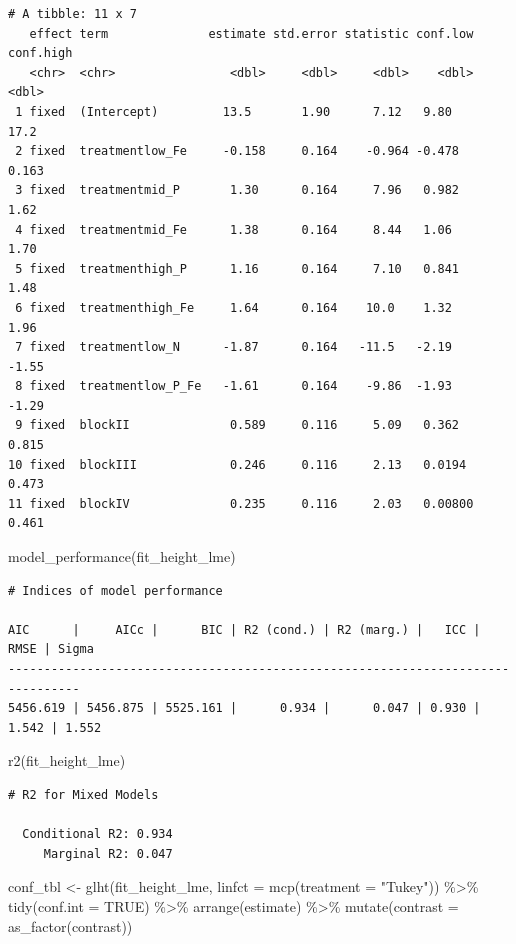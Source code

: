 \documentclass[
  letterpaper,
]{scrbook}
\newenvironment{Shaded}{\begin{snugshade}}{\end{snugshade}}
\newcommand{\AttributeTok}[1]{\textcolor[rgb]{0.40,0.45,0.13}{#1}}
\newcommand{\ConstantTok}[1]{\textcolor[rgb]{0.56,0.35,0.01}{#1}}
\newcommand{\FunctionTok}[1]{\textcolor[rgb]{0.28,0.35,0.67}{#1}}
\newcommand{\NormalTok}[1]{\textcolor[rgb]{0.00,0.23,0.31}{#1}}
\newcommand{\OtherTok}[1]{\textcolor[rgb]{0.00,0.23,0.31}{#1}}
\newcommand{\SpecialCharTok}[1]{\textcolor[rgb]{0.37,0.37,0.37}{#1}}
\newcommand{\StringTok}[1]{\textcolor[rgb]{0.13,0.47,0.30}{#1}}
\begin{document}
\begin{verbatim}
# A tibble: 11 x 7
   effect term              estimate std.error statistic conf.low conf.high
   <chr>  <chr>                <dbl>     <dbl>     <dbl>    <dbl>     <dbl>
 1 fixed  (Intercept)         13.5       1.90      7.12   9.80       17.2  
 2 fixed  treatmentlow_Fe     -0.158     0.164    -0.964 -0.478       0.163
 3 fixed  treatmentmid_P       1.30      0.164     7.96   0.982       1.62 
 4 fixed  treatmentmid_Fe      1.38      0.164     8.44   1.06        1.70 
 5 fixed  treatmenthigh_P      1.16      0.164     7.10   0.841       1.48 
 6 fixed  treatmenthigh_Fe     1.64      0.164    10.0    1.32        1.96 
 7 fixed  treatmentlow_N      -1.87      0.164   -11.5   -2.19       -1.55 
 8 fixed  treatmentlow_P_Fe   -1.61      0.164    -9.86  -1.93       -1.29 
 9 fixed  blockII              0.589     0.116     5.09   0.362       0.815
10 fixed  blockIII             0.246     0.116     2.13   0.0194      0.473
11 fixed  blockIV              0.235     0.116     2.03   0.00800     0.461
\end{verbatim}

\begin{Shaded}
\begin{Highlighting}[]
\FunctionTok{model\_performance}\NormalTok{(fit\_height\_lme) }
\end{Highlighting}
\end{Shaded}

\begin{verbatim}
# Indices of model performance

AIC      |     AICc |      BIC | R2 (cond.) | R2 (marg.) |   ICC |  RMSE | Sigma
--------------------------------------------------------------------------------
5456.619 | 5456.875 | 5525.161 |      0.934 |      0.047 | 0.930 | 1.542 | 1.552
\end{verbatim}

\begin{Shaded}
\begin{Highlighting}[]
\FunctionTok{r2}\NormalTok{(fit\_height\_lme)}
\end{Highlighting}
\end{Shaded}

\begin{verbatim}
# R2 for Mixed Models

  Conditional R2: 0.934
     Marginal R2: 0.047
\end{verbatim}

\begin{Shaded}
\begin{Highlighting}[]
\NormalTok{conf\_tbl }\OtherTok{\textless{}{-}} \FunctionTok{glht}\NormalTok{(fit\_height\_lme, }\AttributeTok{linfct =} \FunctionTok{mcp}\NormalTok{(}\AttributeTok{treatment =} \StringTok{"Tukey"}\NormalTok{)) }\SpecialCharTok{\%\textgreater{}\%} 
  \FunctionTok{tidy}\NormalTok{(}\AttributeTok{conf.int =} \ConstantTok{TRUE}\NormalTok{) }\SpecialCharTok{\%\textgreater{}\%} 
  \FunctionTok{arrange}\NormalTok{(estimate) }\SpecialCharTok{\%\textgreater{}\%} 
  \FunctionTok{mutate}\NormalTok{(}\AttributeTok{contrast =} \FunctionTok{as\_factor}\NormalTok{(contrast))}
\end{Highlighting}
\end{Shaded}
\end{document}
